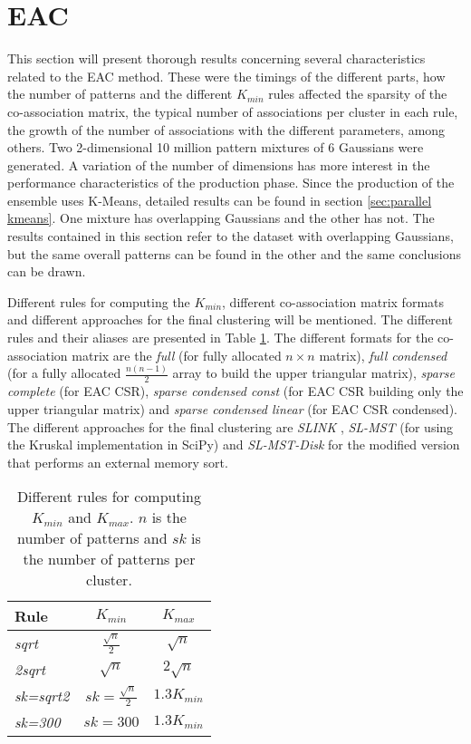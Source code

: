 \section{EAC}
\label{sec:eac results}

This section will present thorough results concerning several characteristics related to the EAC method.
These were the timings of the different parts, how the number of patterns and the different $K_{min}$ rules affected the sparsity of the co-association matrix, the typical number of associations per cluster in each rule, the growth of the number of associations with the different parameters, among others.
Two 2-dimensional 10 million pattern mixtures of 6 Gaussians were generated.
A variation of the number of dimensions has more interest in the performance characteristics of the production phase.
Since the production of the ensemble uses K-Means, detailed results can be found in section \ref{sec:parallel kmeans}.
One mixture has overlapping Gaussians and the other has not.
The results contained in this section refer to the dataset with overlapping Gaussians, but the same overall patterns can be found in the other and the same conclusions can be drawn.

Different rules for computing the $K_{min}$, different co-association matrix formats and different approaches for the final clustering will be mentioned.
The different rules and their aliases are presented in Table \ref{tab:eac rules}.
The different formats for the co-association matrix are the \emph{full} (for fully allocated $n \times n$ matrix), \emph{full condensed} (for a fully allocated $\frac{n(n-1)}{2}$ array to build the upper triangular matrix), \emph{sparse complete} (for EAC CSR), \emph{sparse condensed const} (for EAC CSR building only the upper triangular matrix) and \emph{sparse condensed linear} (for EAC CSR condensed).
The different approaches for the final clustering are \emph{SLINK} \cite{Sibson1973}, \emph{SL-MST} (for using the Kruskal implementation in SciPy) and \emph{SL-MST-Disk} for the modified version that performs an external memory sort.

\begin{table}[h]
\centering
\caption{Different rules for computing $K_{min}$ and $K_{max}$. $n$ is the number of patterns and $sk$ is the number of patterns per cluster.}

\begin{tabular}{lcc}
\toprule
Rule &  $K_{min}$ &  $K_{max}$ \\
\midrule
\emph{sqrt}     & $\frac{\sqrt{n}}{2}$      & $\sqrt{n}$    \\
\emph{2sqrt}    & $\sqrt{n}$                & $2 \sqrt{n}$  \\
\emph{sk=sqrt2} & $sk = \frac{\sqrt{n}}{2}$ & $1.3 K_{min}$ \\
\emph{sk=300}   & $sk = 300$                & $1.3 K_{min}$ \\
\bottomrule
\end{tabular}

\label{tab:eac rules}
\end{table}

